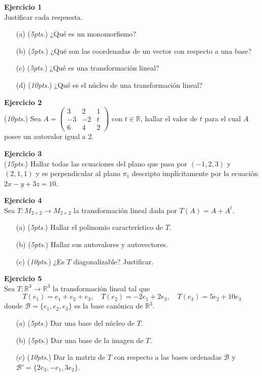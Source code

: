 \documentclass{article}
\newenvironment{problem}[2][Ejercicio]
    { \begin{mdframed}[backgroundcolor=gray!20] \textbf{#1 #2} \\}
    {  \end{mdframed}}
\begin{document}

\begin{problem}{1}
    Justificar cada respuesta.
    \begin{itemize}
        \item[(a)] (\textit{5pts.}) ¿Qué es un monomorfismo?
        \item[(b)] (\textit{5pts.}) ¿Qué son las coordenadas de un vector con respecto a una base? 
        \item[(c)] (\textit{5pts.}) ¿Qué es una transformación lineal?
        \item[(d)] (\textit{10pts.}) ¿Qué es el núcleo de una transformación lineal?  
    \end{itemize}
\end{problem}

\begin{problem}{2}
    (\textit{10pts.}) Sea $A= \begin{pmatrix} 3 & 2 & 1 \\ -3 & -2 & t \\ 6 & 4 & 2 \end{pmatrix}$ con $t \in \mathbb{R}$, hallar el valor de $t$ para el cual $A$ posee un autovalor igual a $2$.
\end{problem}

\begin{problem}{3}
    (\textit{15pts.}) Hallar todas las ecuaciones del plano que pasa por $(-1,2,3)$ y $(2,1,1)$ y es perpendicular al plano $\pi_1$ descripto implícitamente por la ecuación $2x-y+3z=10$.
\end{problem}

\begin{problem}{4}
    Sea $T: M_{2 \times 2} \to M_{2 \times 2}$ la transformación lineal dada por $T(A)=A+A^t$.
    \begin{itemize}
        \item[(a)] (\textit{5pts.}) Hallar el polinomio característico de $T$.
        \item[(b)] (\textit{5pts.}) Hallar sus autovalores y autovectores.
        \item[(c)] (\textit{10pts.}) ¿Es $T$ diagonalizable? Justificar.   
    \end{itemize} 
\end{problem}

\begin{problem}{5}
    Sea $T: \mathbb{R}^3 \to \mathbb{R}^3$ la transformación lineal tal que
    $$
    T(e_1) = e_1+e_2+e_3, \quad T(e_2) = -2e_1+2e_3, \quad T(e_3) = 5e_2+10e_3
    $$
    donde $\mathcal{B} = \{e_1, e_2, e_3\}$ es la base canónica de $\mathbb{R}^3$.
    \begin{itemize}
        \item[(a)] (\textit{5pts.}) Dar una base del núcleo de $T$.
        \item[(b)] (\textit{5pts.}) Dar una base de la imagen de $T$.
        \item[(c)] (\textit{10pts.}) Dar la matriz de $T$ con respecto a las bases ordenadas $\mathcal{B}$ y $\mathcal{B}'=\{ 2e_3,-e_1,3e_2 \}$.  
    \end{itemize}
\end{problem}
\end{document}
